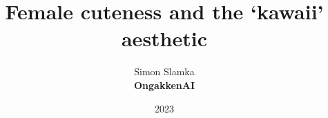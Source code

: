 \documentclass{article}
\title{Female cuteness and the `kawaii' aesthetic}
\author{Simon Slamka\\
\small\textbf{OngakkenAI}}
\date{2023}
\begin{document}
\maketitle

\begin{abstract}

\end{abstract}

\printbibliography
\end{document}

